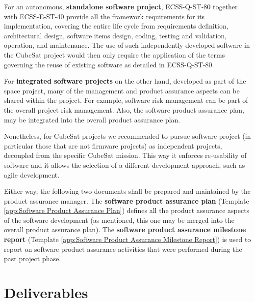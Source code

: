 For an autonomous, \textbf{standalone software project}, ECSS-Q-ST-80 together with ECSS-E-ST-40 \cite{ECSS-E-ST-40} provide all the framework requirements for its implementation, covering the entire life cycle from requirements definition, architectural design, software items design, coding, testing and validation, operation, and maintenance. The use of such independently developed software in the CubeSat project would then only require the application of the terms governing the reuse of existing software as detailed in ECSS-Q-ST-80.

For \textbf{integrated software projects} on the other hand, developed as part of the space project, many of the management and product assurance aspects can be shared within the project. For example, software risk management can be part of the overall project risk management. Also, the software product assurance plan, may be integrated into the overall product assurance plan. 

Nonetheless, for CubeSat projects we recommended to pursue software project (in particular those that are not firmware projects) as independent projects, decoupled from the specific CubeSat mission. This way it enforces re-usability of software and it allows the selection of a different development approach, such as agile development. 

Either way, the following two documents shall be prepared and maintained by the product assurance manager. The \textbf{software product assurance plan} (Template \ref{app:Software Product Assurance Plan}) defines all the product assurance aspects of the software development (as mentioned, this one may be merged into the overall product assurance plan). The \textbf{software product assurance milestone report} (Template \ref{app:Software Product Assurance Milestone Report}) is used to report on software product assurance activities that were performed during the past project phase.

\clearpage
\section{Deliverables}
\label{sec:Product Assurance Deliverables}


